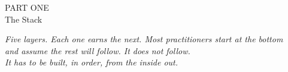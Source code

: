 \documentclass[12pt]{article}
\begin{document}
\vspace*{1.2in}
\begin{center}
  {\fontsize{8}{10}\selectfont\ttfamily\color[RGB]{184,146,42} PART ONE}\\[0.4em]
  {\fontsize{22}{26}\selectfont The Stack}
\end{center}
\vspace{0.6em}
\begin{center}
  \small\itshape Five layers. Each one earns the next. Most practitioners start at the bottom\\
  and assume the rest will follow. It does not follow.\\
  It has to be built, in order, from the inside out.
\end{center}
\vspace{1.2em}


\end{document}
